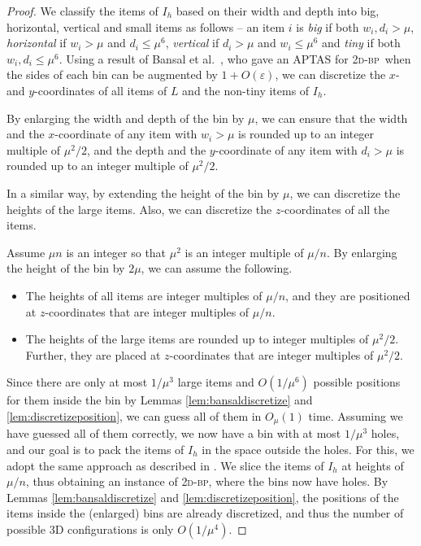 \documentclass[a4paper,UKenglish,cleveref, autoref, thm-restate]{lipics-v2021}
\newcommand{\twobp}{\textsc{2d-bp}\xspace}
\begin{document}
\begin{proof}
    We classify the items of $I_h$ based on their width and depth into big, horizontal, vertical and small items as follows -- an item $i$ is \emph{big} if both $w_i, d_i > \mu$, \emph{horizontal} if $w_i > \mu$ and $d_i \le \mu^6$, \emph{vertical} if $d_i > \mu$ and $w_i \le \mu^6$ and \emph{tiny} if both $w_i, d_i \le \mu^6$. Using a result of Bansal et al.~\cite{bansal2006bin}, who gave an APTAS for \twobp~when the sides of each bin can be augmented by $1+O(\varepsilon)$, we can discretize the $x$- and $y$-coordinates of all items of $L$ and the non-tiny items of $I_h$.

\begin{lemma}
\label{lem:bansaldiscretize}
    By enlarging the width and depth of the bin by $\mu$, we can ensure that the width and the $x$-coordinate of any item with $w_i > \mu$ is rounded up to an integer multiple of $\mu^2/2$, and the depth and the $y$-coordinate of any item with $d_i > \mu$ is rounded up to an integer multiple of $\mu^2/2$.
\end{lemma}

In a similar way, by extending the height of the bin by $\mu$, we can discretize the heights of the large items. Also, we can discretize the $z$-coordinates of all the items.

\begin{lemma}
\label{lem:discretizeposition}
    Assume $\mu n$ is an integer so that $\mu^2$ is an integer multiple of $\mu/n$. By enlarging the height of the bin by $2\mu$, we can assume the following.
    \begin{itemize}
        \item The heights of all items are integer multiples of $\mu/n$, and they are positioned at $z$-coordinates that are integer multiples of $\mu/n$.
        \item The heights of the large items are rounded up to integer multiples of $\mu^2/2$. Further, they are placed at $z$-coordinates that are integer multiples of $\mu^2/2$.
\end{itemize}
\end{lemma}

Since there are only at most $1/\mu^3$ large items and $O(1/\mu^6)$ possible positions for them inside the bin by Lemmas \ref{lem:bansaldiscretize} and \ref{lem:discretizeposition}, we can guess all of them in $O_{\mu}(1)$ time. Assuming we have guessed all of them correctly, we now have a bin with at most $1/\mu^3$ holes, and our goal is to pack the items of $I_h$ in the space outside the holes. For this, we adopt the same approach as described in . We slice the items of $I_h$ at heights of $\mu/n$, thus obtaining an instance of \twobp, where the bins now have holes. By Lemmas \ref{lem:bansaldiscretize} and \ref{lem:discretizeposition}, the positions of the items inside the (enlarged) bins are already discretized, and thus the number of possible 3D configurations is only $O(1/\mu^4)$.


\end{proof}
\end{document}
